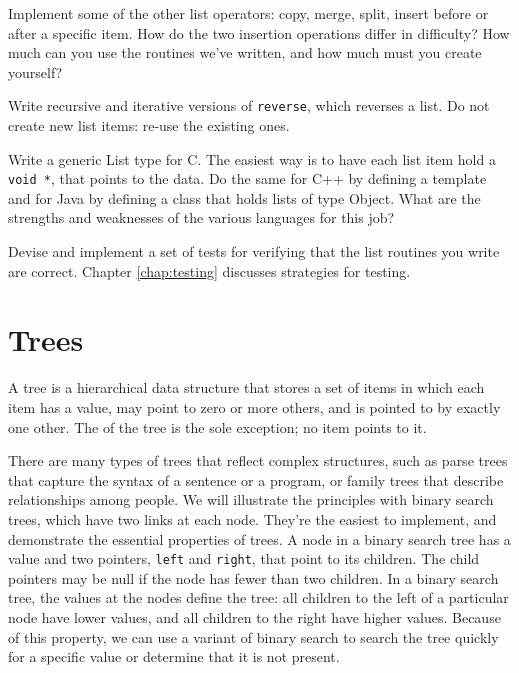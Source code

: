 \begin{exercise}
Implement some of the other list operators: copy, merge, split, insert
before or after a specific item. How do the two insertion operations differ
in difficulty? How much can you use the routines we've written, and how
much must you create yourself?
\end{exercise}

\begin{exercise}
Write recursive and iterative versions of \verb'reverse', which reverses a
list.  Do not create new list items: re-use the existing ones.
\end{exercise}

\begin{exercise}
Write a generic List type for C. The easiest way is to have each list item
hold a \verb'void *', that points to the data. Do the same for C++ by
defining a template and for Java by defining a class that holds lists of
type Object. What are the strengths and weaknesses of the various languages
for this job?
\end{exercise}

\begin{exercise}
Devise and implement a set of tests for verifying that the list routines
you write are correct. Chapter \ref{chap:testing} discusses strategies for
testing.
\end{exercise}

\section{Trees}
\label{sec:trees}

A tree is a hierarchical data structure that stores a set of items in which
each item has a value, may point to zero or more others, and is pointed to
by exactly one other. The  of the tree is the sole
exception; no item points to it.

There are many types of trees that reflect complex structures, such as
parse trees that capture the syntax of a sentence or a program, or family
trees that describe relationships among people. We will illustrate the
principles with binary search trees, which have two links at each node.
They're the easiest to implement, and demonstrate the essential properties
of trees. A node in a binary search tree has a value and two pointers,
\verb'left' and \verb'right', that point to its children. The child
pointers may be null if the node has fewer than two children. In a binary
search tree, the values at the nodes define the tree: all children to the
left of a particular node have lower values, and all children to the right
have higher values. Because of this property, we can use a variant of
binary search to search the tree quickly for a specific value or determine
that it is not present.

